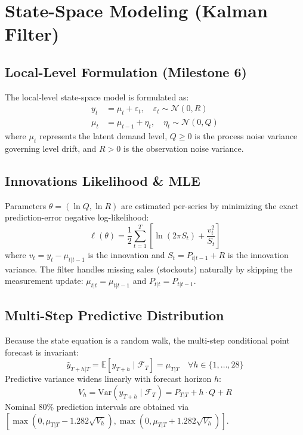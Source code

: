 \documentclass[conference]{IEEEtran}
\begin{document}
\section{State-Space Modeling (Kalman Filter)}

\subsection{Local-Level Formulation (Milestone 6)}
The local-level state-space model is formulated as:
\begin{align}
y_t &= \mu_t + \varepsilon_t, \quad \varepsilon_t \sim \mathcal{N}(0, R) \label{eq:obs}\\
\mu_t &= \mu_{t-1} + \eta_t, \quad \eta_t \sim \mathcal{N}(0, Q) \label{eq:state}
\end{align}
where $\mu_t$ represents the latent demand level, $Q \ge 0$ is the process noise variance governing level drift, and $R > 0$ is the observation noise variance.

\subsection{Innovations Likelihood \& MLE}
Parameters $\theta = (\ln Q, \ln R)$ are estimated per-series by minimizing the exact prediction-error negative log-likelihood:
\begin{equation}
\ell(\theta) = \frac{1}{2}\sum_{t=1}^T \left[ \ln(2\pi S_t) + \frac{v_t^2}{S_t} \right]
\end{equation}
where $v_t = y_t - \mu_{t|t-1}$ is the innovation and $S_t = P_{t|t-1} + R$ is the innovation variance. The filter handles missing sales (stockouts) naturally by skipping the measurement update: $\mu_{t|t} = \mu_{t|t-1}$ and $P_{t|t} = P_{t|t-1}$.

\subsection{Multi-Step Predictive Distribution}
Because the state equation is a random walk, the multi-step conditional point forecast is invariant:
\begin{equation}
\hat{y}_{T+h|T} = \mathbb{E}[y_{T+h} \mid \mathcal{F}_T] = \mu_{T|T} \quad \forall h \in \{1,\dots,28\}
\end{equation}
Predictive variance widens linearly with forecast horizon $h$:
\begin{equation}
V_h = \text{Var}(y_{T+h} \mid \mathcal{F}_T) = P_{T|T} + h \cdot Q + R
\end{equation}
Nominal 80\% prediction intervals are obtained via $[\max(0, \mu_{T|T} - 1.282\sqrt{V_h}), \max(0, \mu_{T|T} + 1.282\sqrt{V_h})]$.
\end{document}
